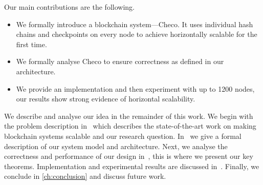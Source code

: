 Our main contributions are the following.
\begin{itemize}
    \item We formally introduce a blockchain system---Checo.
        It uses individual hash chains and checkpoints on every node to achieve
        horizontally scalable for the first time.
    \item We formally analyse Checo to ensure correctness as defined in our architecture.
    \item We provide an implementation and then experiment with up to 1200 nodes,
        our results show strong evidence of horizontal scalability.
\end{itemize}

We describe and analyse our idea in the remainder of this work.
We begin with the problem description in~ which describes the state-of-the-art work on making blockchain systems scalable and our research question.
In~ we give a formal description of our system model and architecture.
Next, we analyse the correctness and performance of our design in~, this is where we present our key theorems.
Implementation and experimental results are discussed in~.
Finally, we conclude in \ref{ch:conclusion} and discuss future work.
